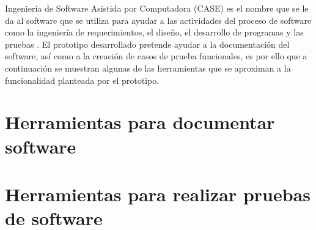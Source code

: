 Ingeniería de Software Asistida por Computadora (CASE) es el nombre que se le da al software que se utiliza para ayudar a las actividades del proceso de software como la ingeniería de requerimientos, el diseño, el desarrollo de programas y las pruebas \cite{sommerville1992software}. El prototipo desarrollado pretende ayudar a la documentación del software, así como a la creación de casos de prueba funcionales, es por ello que a continuación se muestran algunas de las herramientas que se aproximan a la funcionalidad planteada por el prototipo.

\section{Herramientas para documentar software}

\section{Herramientas para realizar pruebas de software}
